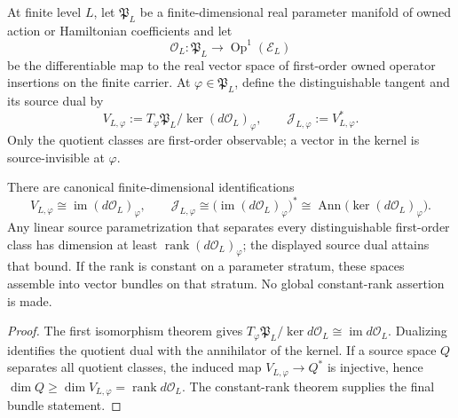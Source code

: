 \documentclass[12pt,a4paper]{article}
\begin{document}
\begin{definition}
\label{p12:def:minimal-source-quotient}
At finite level \(L\), let \(\mathfrak P_L\) be a finite-dimensional real
parameter manifold of owned action or Hamiltonian coefficients and let
\[
 \mathscr O_L:\mathfrak P_L\longrightarrow
 \operatorname{Op}^{1}(\mathcal E_L)
\]
be the differentiable map to the real vector space of first-order owned
operator insertions on the finite carrier.  At \(\varphi\in\mathfrak P_L\),
define the distinguishable tangent and its source dual by
\[
 V_{L,\varphi}
 :=T_\varphi\mathfrak P_L/\ker(d\mathscr O_L)_\varphi,
 \qquad
 \mathcal J_{L,\varphi}:=V_{L,\varphi}^*.
\]
Only the quotient classes are first-order observable; a vector in the kernel
is source-invisible at \(\varphi\).
\end{definition}

\begin{theorem}
\label{p12:thm:minimal-source-quotient}
There are canonical finite-dimensional identifications
\[
 V_{L,\varphi}\cong\operatorname{im}(d\mathscr O_L)_\varphi,
 \qquad
 \mathcal J_{L,\varphi}
 \cong\bigl(\operatorname{im}(d\mathscr O_L)_\varphi\bigr)^*
 \cong\operatorname{Ann}\!\bigl(\ker(d\mathscr O_L)_\varphi\bigr).
\]
Any linear source parametrization that separates every distinguishable
first-order class has dimension at least
\(\operatorname{rank}(d\mathscr O_L)_\varphi\); the displayed source dual
attains that bound.  If the rank is constant on a parameter stratum, these
spaces assemble into vector bundles on that stratum.  No global
constant-rank assertion is made.
\end{theorem}

\begin{proof}
The first isomorphism theorem gives
\(T_\varphi\mathfrak P_L/\ker d\mathscr O_L\cong\operatorname{im}d\mathscr O_L\).
Dualizing identifies the quotient dual with the annihilator of the kernel.
If a source space \(Q\) separates all quotient classes, the induced map
\(V_{L,\varphi}\to Q^*\) is injective, hence
\(\dim Q\ge\dim V_{L,\varphi}=\operatorname{rank}d\mathscr O_L\).  The
constant-rank theorem supplies the final bundle statement.
\end{proof}
\end{document}
